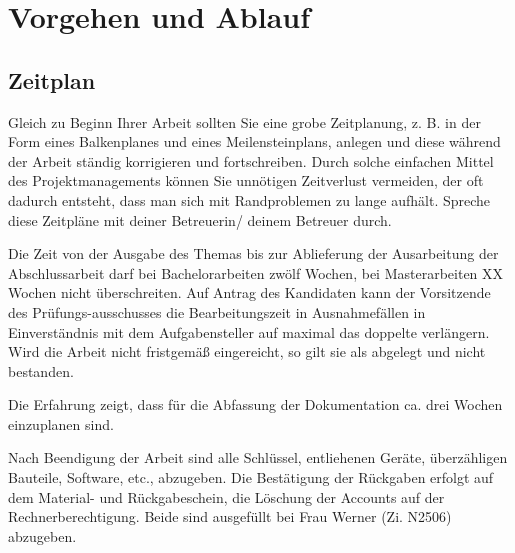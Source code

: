 \section{Vorgehen und Ablauf}
\label{sec:ablauf}

\subsection{Zeitplan}
Gleich zu Beginn Ihrer Arbeit sollten Sie eine grobe Zeitplanung, z. B. in der Form eines Balkenplanes und eines Meilensteinplans, anlegen und diese während der Arbeit ständig korrigieren und fortschreiben. Durch solche einfachen Mittel des Projektmanagements können Sie unnötigen Zeitverlust vermeiden, der oft dadurch entsteht, dass man sich mit Randproblemen zu lange aufhält. Spreche diese Zeitpläne mit deiner Betreuerin/ deinem Betreuer durch.

Die Zeit von der Ausgabe des Themas bis zur Ablieferung der Ausarbeitung der Abschlussarbeit darf bei Bachelorarbeiten zwölf Wochen, bei Masterarbeiten XX Wochen nicht überschreiten. Auf Antrag des Kandidaten kann der Vorsitzende des Prüfungs-ausschusses die Bearbeitungszeit in Ausnahmefällen in Einverständnis mit dem Aufgabensteller auf maximal das doppelte verlängern. Wird die Arbeit nicht fristgemäß eingereicht, so gilt sie als abgelegt und nicht bestanden.

Die Erfahrung zeigt, dass für die Abfassung der Dokumentation ca. drei Wochen einzuplanen sind.



Nach Beendigung der Arbeit sind alle Schlüssel, entliehenen Geräte, überzähligen Bauteile, Software, etc., abzugeben. Die Bestätigung der Rückgaben erfolgt auf dem Material- und Rückgabeschein, die Löschung der Accounts auf der Rechnerberechtigung. Beide sind ausgefüllt bei Frau Werner (Zi. N2506) abzugeben. 


